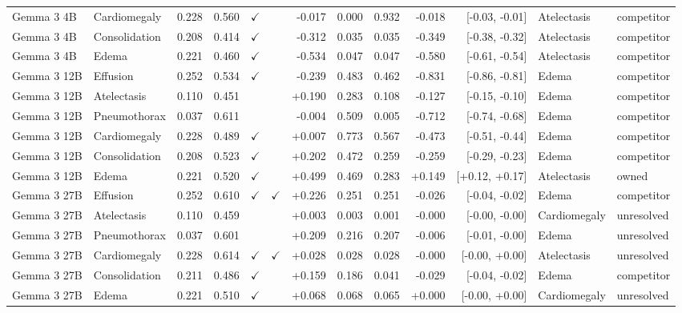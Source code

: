 \begin{longtable}{llrrccrrrrrll}
Gemma 3 4B & Cardiomegaly & 0.228 & 0.560 & $\checkmark$ &  & -0.017 & 0.000 & 0.932 & -0.018 & [-0.03, -0.01] & Atelectasis & competitor \\
Gemma 3 4B & Consolidation & 0.208 & 0.414 & $\checkmark$ &  & -0.312 & 0.035 & 0.035 & -0.349 & [-0.38, -0.32] & Atelectasis & competitor \\
Gemma 3 4B & Edema & 0.221 & 0.460 & $\checkmark$ &  & -0.534 & 0.047 & 0.047 & -0.580 & [-0.61, -0.54] & Atelectasis & competitor \\
Gemma 3 12B & Effusion & 0.252 & 0.534 & $\checkmark$ &  & -0.239 & 0.483 & 0.462 & -0.831 & [-0.86, -0.81] & Edema & competitor \\
Gemma 3 12B & Atelectasis & 0.110 & 0.451 &  &  & +0.190 & 0.283 & 0.108 & -0.127 & [-0.15, -0.10] & Edema & competitor \\
Gemma 3 12B & Pneumothorax & 0.037 & 0.611 &  &  & -0.004 & 0.509 & 0.005 & -0.712 & [-0.74, -0.68] & Edema & competitor \\
Gemma 3 12B & Cardiomegaly & 0.228 & 0.489 & $\checkmark$ &  & +0.007 & 0.773 & 0.567 & -0.473 & [-0.51, -0.44] & Edema & competitor \\
Gemma 3 12B & Consolidation & 0.208 & 0.523 & $\checkmark$ &  & +0.202 & 0.472 & 0.259 & -0.259 & [-0.29, -0.23] & Edema & competitor \\
\rowcolor{cfSlate2}Gemma 3 12B & Edema & 0.221 & 0.520 & $\checkmark$ &  & +0.499 & 0.469 & 0.283 & +0.149 & [+0.12, +0.17] & Atelectasis & owned \\
Gemma 3 27B & Effusion & 0.252 & 0.610 & $\checkmark$ & $\checkmark$ & +0.226 & 0.251 & 0.251 & -0.026 & [-0.04, -0.02] & Edema & competitor \\
Gemma 3 27B & Atelectasis & 0.110 & 0.459 &  &  & +0.003 & 0.003 & 0.001 & -0.000 & [-0.00, -0.00] & Cardiomegaly & unresolved \\
Gemma 3 27B & Pneumothorax & 0.037 & 0.601 &  &  & +0.209 & 0.216 & 0.207 & -0.006 & [-0.01, -0.00] & Edema & unresolved \\
Gemma 3 27B & Cardiomegaly & 0.228 & 0.614 & $\checkmark$ & $\checkmark$ & +0.028 & 0.028 & 0.028 & -0.000 & [-0.00, +0.00] & Atelectasis & unresolved \\
Gemma 3 27B & Consolidation & 0.211 & 0.486 & $\checkmark$ &  & +0.159 & 0.186 & 0.041 & -0.029 & [-0.04, -0.02] & Edema & competitor \\
Gemma 3 27B & Edema & 0.221 & 0.510 & $\checkmark$ &  & +0.068 & 0.068 & 0.065 & +0.000 & [-0.00, +0.00] & Cardiomegaly & unresolved \\

\end{longtable}

